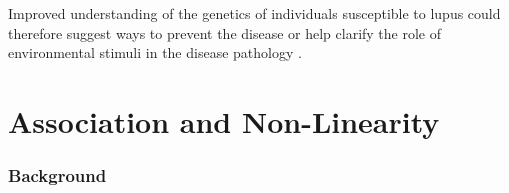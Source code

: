 \documentclass[a4paper, 12pt]{report}
\begin{document}
Improved understanding of the genetics of individuals susceptible to lupus could therefore suggest ways to  prevent the disease or help clarify the role of environmental stimuli in the disease pathology \cite{autoimmunePollard}.








\chapter{Association and Non-Linearity}

\subsection*{Background}
%
%
%
%
%
%
%
%
%
%
%
\end{document}
